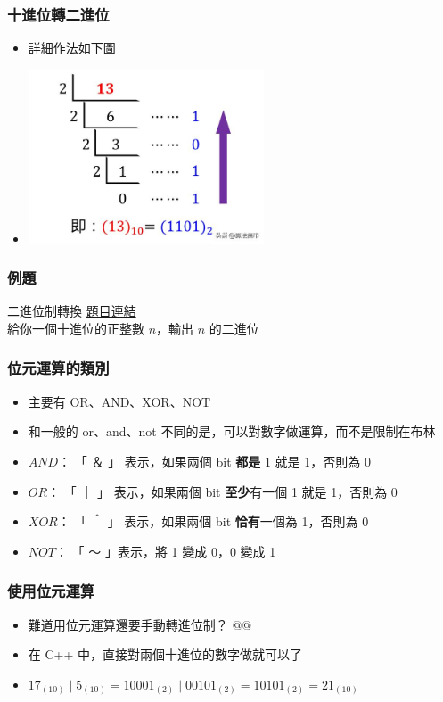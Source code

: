 \documentclass{beamer}
\begin{document}
\begin{frame}
    \frametitle{十進位轉二進位}
    \begin{itemize}
        \item 詳細作法如下圖
        \item \includegraphics[width=7.0cm]{img/img_1.png}
    \end{itemize}
\end{frame}

\begin{frame}
    \frametitle{例題}
    \begin{block}{二進位制轉換}
        \href{https://zerojudge.tw/ShowProblem?problemid=a034}{題目連結}\\
        給你一個十進位的正整數 $n$，輸出 $n$ 的二進位
    \end{block}
\end{frame}

\begin{frame}
    \frametitle{位元運算的類別}
    \begin{itemize}
        \item 主要有 OR、AND、XOR、NOT
        \item 和一般的 or、and、not 不同的是，可以對數字做運算，而不是限制在布林
        \vspace{0.5cm}
        \item<2-> $AND$： 「 ＆ 」 表示，如果兩個 bit \textbf{都是} 1 就是 1，否則為 0
        \item<2-> $OR$： 「 ｜ 」 表示，如果兩個 bit \textbf{至少}有一個 1 就是 1，否則為 0
        \item<2-> $XOR$： 「 ＾ 」 表示，如果兩個 bit \textbf{恰有}一個為 1，否則為 0
        \item<2-> $NOT$： 「 ～ 」表示，將 1 變成 0，0 變成 1
    \end{itemize}
\end{frame}

\begin{frame}
    \frametitle{使用位元運算}
    \begin{itemize}
        \item 難道用位元運算還要手動轉進位制？ @@
        \item<2-> 在 C++ 中，直接對兩個十進位的數字做就可以了
        \item<2-> $17_{(10)} \mid 5_{(10)} = 10001_{(2)} \mid 00101_{(2)} = 10101_{(2)} = 21_{(10)}$
    \end{itemize}
\end{frame}
\end{document}
